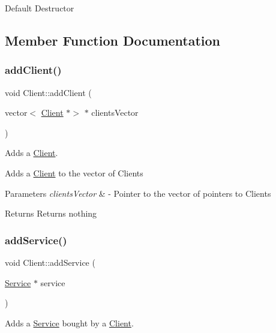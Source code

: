 Default Destructor 

\subsection{Member Function Documentation}
\mbox{\label{class_client_acd07078857cade36eee66b733de7bc38}} 
\subsubsection{\texorpdfstring{add\+Client()}{addClient()}}
{\footnotesize\ttfamily void Client\+::add\+Client (\begin{DoxyParamCaption}\item[{vector$<$ \hyperlink{class_client}{Client} $\ast$$>$ $\ast$}]{clients\+Vector }\end{DoxyParamCaption})\hspace{0.3cm}{\ttfamily [static]}}



Adds a \hyperlink{class_client}{Client}. 

Adds a \hyperlink{class_client}{Client} to the vector of Clients


\begin{DoxyParams}{Parameters}
{\em clients\+Vector} & -\/ Pointer to the vector of pointers to Clients \\
\hline
\end{DoxyParams}
\begin{DoxyReturn}{Returns}
Returns nothing 
\end{DoxyReturn}
\mbox{\label{class_client_abf36aa7168464608e917fa40f1ba52db}} 
\subsubsection{\texorpdfstring{add\+Service()}{addService()}}
{\footnotesize\ttfamily void Client\+::add\+Service (\begin{DoxyParamCaption}\item[{\hyperlink{class_service}{Service} $\ast$}]{service }\end{DoxyParamCaption})}



Adds a \hyperlink{class_service}{Service} bought by a \hyperlink{class_client}{Client}. 

